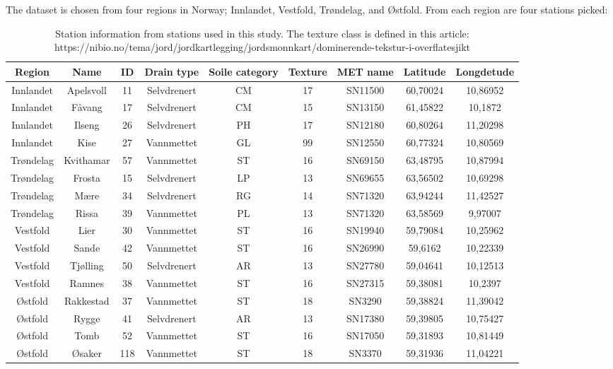 The dataset is chosen from four regions in Norway; Innlandet, Vestfold, Trøndelag, and Østfold. From each region are four stations picked:
\begin{table}[h]
	\begin{adjustwidth}{-1in}{-1in}
		\centering
		\begin{tabular}{ccccccccc}
			\hline Region&Name&ID&Drain type&Soile category&Texture&MET name& Latitude&Longdetude\\\hline
			Innlandet&Apelsvoll&11& Selvdrenert&CM& 17&SN11500&60,70024&10,86952\\
			Innlandet& Fåvang&17& Selvdrenert&CM& 15&SN13150&61,45822&10,1872\\
			Innlandet& Ilseng&26& Selvdrenert&PH& 17&SN12180&60,80264&11,20298\\
			Innlandet& Kise&27& Vannmettet&GL& 99&SN12550&60,77324&10,80569\\
			Trøndelag& Kvithamar&57& Vannmettet&ST& 16&SN69150&63,48795&10,87994\\
			Trøndelag& Frosta&15& Selvdrenert&LP& 13&SN69655&63,56502&10,69298\\
			Trøndelag& Mære&34& Selvdrenert&RG& 14&SN71320&63,94244&11,42527\\
			Trøndelag& Rissa&39& Vannmettet&PL& 13&SN71320&63,58569&9,97007\\
			Vestfold& Lier&30& Vannmettet&ST& 16&SN19940&59,79084&10,25962\\
			Vestfold& Sande&42& Vannmettet&ST& 16&SN26990&59,6162&10,22339\\
			Vestfold& Tjølling&50& Selvdrenert&AR& 13&SN27780&59,04641&10,12513\\
			Vestfold& Ramnes&38& Vannmettet&ST& 16&SN27315&59,38081&10,2397\\
			Østfold& Rakkestad&37& Vannmettet&ST& 18&SN3290&59,38824&11,39042\\
			Østfold& Rygge&41& Selvdrenert&AR& 13&SN17380&59,39805&10,75427\\
			Østfold& Tomb&52& Vannmettet&ST& 16&SN17050&59,31893&10,81449\\
			Østfold& Øsaker&118& Vannmettet&ST& 18&SN3370&59,31936&11,04221\\\hline
		\end{tabular}
	\end{adjustwidth}
	\caption[Soil information for each station/w location and MET-ID]{Station information from stations used in this study. The texture class is defined in this article: https://nibio.no/tema/jord/jordkartlegging/jordsmonnkart/dominerende-tekstur-i-overflatesjikt}
\end{table}

